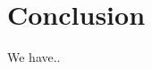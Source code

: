 \graphicspath{{Chapters/Project/}}

\section{Conclusion} %
\label{sec:conclusion}

We have..





\cite{AlexNet}
\cite{ZeilerFergus}




% 
